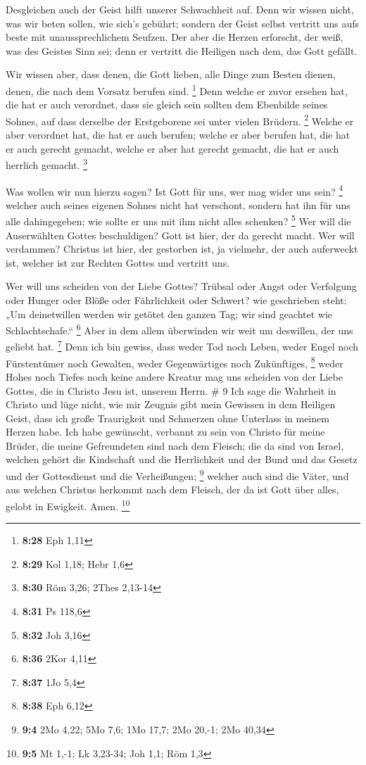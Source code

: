  Desgleichen auch der Geist hilft unserer Schwachheit auf.
Denn wir wissen nicht, was wir beten sollen, wie sich's gebührt; sondern
der Geist selbst vertritt uns aufs beste mit unaussprechlichem Seufzen.
 Der aber die Herzen erforscht, der weiß, was des Geistes
Sinn sei; denn er vertritt die Heiligen nach dem, das Gott gefällt.

 Wir wissen aber, dass denen, die Gott lieben, alle Dinge
zum Besten dienen, denen, die nach dem Vorsatz berufen sind. \footnote{\textbf{8:28}
  Eph 1,11}  Denn welche er zuvor ersehen hat, die hat er
auch verordnet, dass sie gleich sein sollten dem Ebenbilde seines
Sohnes, auf dass derselbe der Erstgeborene sei unter vielen Brüdern.
\footnote{\textbf{8:29} Kol 1,18; Hebr 1,6}  Welche er aber
verordnet hat, die hat er auch berufen; welche er aber berufen hat, die
hat er auch gerecht gemacht, welche er aber hat gerecht gemacht, die hat
er auch herrlich gemacht. \footnote{\textbf{8:30} Röm 3,26; 2Thes
  2,13-14}

 Was wollen wir nun hierzu sagen? Ist Gott für uns, wer mag
wider uns sein? \footnote{\textbf{8:31} Ps 118,6}  welcher
auch seines eigenen Sohnes nicht hat verschont, sondern hat ihn für uns
alle dahingegeben; wie sollte er uns mit ihm nicht alles schenken?
\footnote{\textbf{8:32} Joh 3,16}  Wer will die
Auserwählten Gottes beschuldigen? Gott ist hier, der da gerecht macht.
 Wer will verdammen? Christus ist hier, der gestorben ist,
ja vielmehr, der auch auferweckt ist, welcher ist zur Rechten Gottes und
vertritt uns.

 Wer will uns scheiden von der Liebe Gottes? Trübsal oder
Angst oder Verfolgung oder Hunger oder Blöße oder Fährlichkeit oder
Schwert?  wie geschrieben steht: „Um deinetwillen werden
wir getötet den ganzen Tag; wir sind geachtet wie Schlachtschafe.``
\footnote{\textbf{8:36} 2Kor 4,11}  Aber in dem allem
überwinden wir weit um deswillen, der uns geliebt hat. \footnote{\textbf{8:37}
  1Jo 5,4}  Denn ich bin gewiss, dass weder Tod noch Leben,
weder Engel noch Fürstentümer noch Gewalten, weder Gegenwärtiges noch
Zukünftiges, \footnote{\textbf{8:38} Eph 6,12}  weder Hohes
noch Tiefes noch keine andere Kreatur mag uns scheiden von der Liebe
Gottes, die in Christo Jesu ist, unserem Herrn. \# 9  Ich
sage die Wahrheit in Christo und lüge nicht, wie mir Zeugnis gibt mein
Gewissen in dem Heiligen Geist,  dass ich große Traurigkeit
und Schmerzen ohne Unterlass in meinem Herzen habe.  Ich
habe gewünscht, verbannt zu sein von Christo für meine Brüder, die meine
Gefreundeten sind nach dem Fleisch;  die da sind von Israel,
welchen gehört die Kindschaft und die Herrlichkeit und der Bund und das
Gesetz und der Gottesdienst und die Verheißungen; \footnote{\textbf{9:4}
  2Mo 4,22; 5Mo 7,6; 1Mo 17,7; 2Mo 20,-1; 2Mo 40,34} 
welcher auch sind die Väter, und aus welchen Christus herkommt nach dem
Fleisch, der da ist Gott über alles, gelobt in Ewigkeit. Amen.
\footnote{\textbf{9:5} Mt 1,-1; Lk 3,23-34; Joh 1,1; Röm 1,3}

